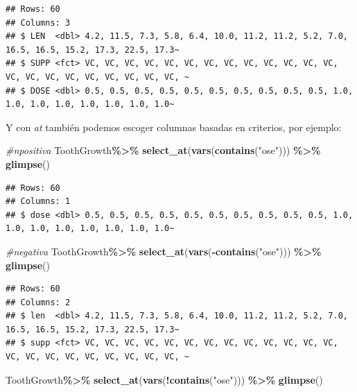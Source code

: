 \documentclass[
]{book}
\newenvironment{Shaded}{\begin{snugshade}}{\end{snugshade}}
\newcommand{\CommentTok}[1]{\textcolor[rgb]{0.56,0.35,0.01}{\textit{#1}}}
\newcommand{\FunctionTok}[1]{\textcolor[rgb]{0.13,0.29,0.53}{\textbf{#1}}}
\newcommand{\NormalTok}[1]{#1}
\newcommand{\SpecialCharTok}[1]{\textcolor[rgb]{0.81,0.36,0.00}{\textbf{#1}}}
\newcommand{\StringTok}[1]{\textcolor[rgb]{0.31,0.60,0.02}{#1}}
\begin{document}
\begin{verbatim}
## Rows: 60
## Columns: 3
## $ LEN  <dbl> 4.2, 11.5, 7.3, 5.8, 6.4, 10.0, 11.2, 11.2, 5.2, 7.0, 16.5, 16.5, 15.2, 17.3, 22.5, 17.3~
## $ SUPP <fct> VC, VC, VC, VC, VC, VC, VC, VC, VC, VC, VC, VC, VC, VC, VC, VC, VC, VC, VC, VC, VC, VC, ~
## $ DOSE <dbl> 0.5, 0.5, 0.5, 0.5, 0.5, 0.5, 0.5, 0.5, 0.5, 0.5, 1.0, 1.0, 1.0, 1.0, 1.0, 1.0, 1.0, 1.0~
\end{verbatim}

\hfill\break
Y con \emph{at} también podemos escoger columnas basadas en criterios, por ejemplo:

\begin{Shaded}
\begin{Highlighting}[]
\CommentTok{\#npositiva}
\NormalTok{ToothGrowth}\SpecialCharTok{\%\textgreater{}\%} \FunctionTok{select\_at}\NormalTok{(}\FunctionTok{vars}\NormalTok{(}\FunctionTok{contains}\NormalTok{(}\StringTok{"ose"}\NormalTok{))) }\SpecialCharTok{\%\textgreater{}\%} \FunctionTok{glimpse}\NormalTok{()}
\end{Highlighting}
\end{Shaded}

\begin{verbatim}
## Rows: 60
## Columns: 1
## $ dose <dbl> 0.5, 0.5, 0.5, 0.5, 0.5, 0.5, 0.5, 0.5, 0.5, 0.5, 1.0, 1.0, 1.0, 1.0, 1.0, 1.0, 1.0, 1.0~
\end{verbatim}

\begin{Shaded}
\begin{Highlighting}[]
\CommentTok{\#negativa}
\NormalTok{ToothGrowth}\SpecialCharTok{\%\textgreater{}\%} \FunctionTok{select\_at}\NormalTok{(}\FunctionTok{vars}\NormalTok{(}\SpecialCharTok{{-}}\FunctionTok{contains}\NormalTok{(}\StringTok{"ose"}\NormalTok{))) }\SpecialCharTok{\%\textgreater{}\%} \FunctionTok{glimpse}\NormalTok{()}
\end{Highlighting}
\end{Shaded}

\begin{verbatim}
## Rows: 60
## Columns: 2
## $ len  <dbl> 4.2, 11.5, 7.3, 5.8, 6.4, 10.0, 11.2, 11.2, 5.2, 7.0, 16.5, 16.5, 15.2, 17.3, 22.5, 17.3~
## $ supp <fct> VC, VC, VC, VC, VC, VC, VC, VC, VC, VC, VC, VC, VC, VC, VC, VC, VC, VC, VC, VC, VC, VC, ~
\end{verbatim}

\begin{Shaded}
\begin{Highlighting}[]
\NormalTok{ToothGrowth}\SpecialCharTok{\%\textgreater{}\%} \FunctionTok{select\_at}\NormalTok{(}\FunctionTok{vars}\NormalTok{(}\SpecialCharTok{!}\FunctionTok{contains}\NormalTok{(}\StringTok{"ose"}\NormalTok{))) }\SpecialCharTok{\%\textgreater{}\%} \FunctionTok{glimpse}\NormalTok{()}
\end{Highlighting}
\end{Shaded}
\end{document}
